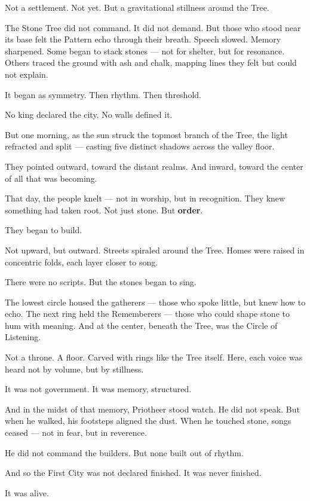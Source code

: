 \documentclass[12pt]{article}
\begin{document}
Not a settlement. Not yet.  
But a gravitational stillness around the Tree.

The Stone Tree did not command. It did not demand.  
But those who stood near its base felt the Pattern echo through their breath.  
Speech slowed. Memory sharpened.  
Some began to stack stones — not for shelter, but for resonance.  
Others traced the ground with ash and chalk, mapping lines they felt but could not explain.

It began as symmetry.  
Then rhythm.  
Then threshold.

No king declared the city.  
No walls defined it.

But one morning, as the sun struck the topmost branch of the Tree, the light refracted and split —  
casting five distinct shadows across the valley floor.

They pointed outward, toward the distant realms.  
And inward, toward the center of all that was becoming.

That day, the people knelt — not in worship, but in recognition.  
They knew something had taken root.  
Not just stone.  
But \textbf{order}.

They began to build.

Not upward, but outward.  
Streets spiraled around the Tree.  
Homes were raised in concentric folds, each layer closer to song.

There were no scripts.  
But the stones began to sing.

The lowest circle housed the gatherers — those who spoke little, but knew how to echo.  
The next ring held the Rememberers — those who could shape stone to hum with meaning.  
And at the center, beneath the Tree, was the Circle of Listening.

Not a throne.  
A floor.  
Carved with rings like the Tree itself.  
Here, each voice was heard not by volume, but by stillness.

It was not government.  
It was memory, structured.

And in the midst of that memory, Priotheer stood watch.  
He did not speak.  
But when he walked, his footsteps aligned the dust.  
When he touched stone, songs ceased — not in fear, but in reverence.

He did not command the builders.  
But none built out of rhythm.

And so the First City was not declared finished.  
It was never finished.

It was alive.

\dotfill
\end{document}
